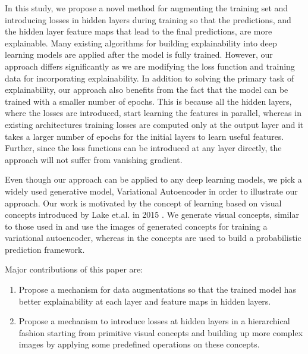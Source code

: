 \documentclass{bmvc2k}
\begin{document}
In this study, we propose a novel method for  augmenting the training set and introducing losses in hidden layers during training so that the predictions, and the hidden layer feature maps that lead to the final predictions,  are more explainable.
Many existing algorithms \cite{ribeiro2016should} \cite{lundberg2017unified} \cite{zhou2016learning} for building explainability into deep learning models are applied after the model is fully trained.
However, our approach differs significantly as we are modifying the loss function and training data for incorporating explainability.
In addition to solving  the primary task of explainability, our approach also benefits from the fact that  the model can be trained with a smaller number of epochs.
This is because all the hidden layers, where the losses are introduced,  start learning the features in parallel, whereas in existing architectures training losses are computed only at the output layer and it takes a larger number of epochs for the initial layers to learn useful features.
Further, since the loss functions can be introduced at any layer directly, the approach will not suffer from vanishing gradient.

Even though our approach can be applied to any deep learning models, we pick a widely used generative model, Variational Autoencoder \cite{kingma2013auto} in order to illustrate our approach.
Our work is motivated by the concept of learning based on visual concepts  introduced by Lake et.al. in 2015 \cite{lake2015human}.
We generate visual concepts, similar to those used in \cite{lake2015human} and use the images of generated concepts for training a variational autoencoder, whereas in \cite{lake2015human} the concepts are used to build a probabilistic prediction framework.


Major contributions of this paper are:
\begin{enumerate}
  \item Propose a mechanism for data augmentations so that the trained model has better explainability at each layer and feature maps in hidden layers.
  \item Propose a mechanism to introduce losses at hidden layers in a hierarchical fashion starting from primitive visual concepts and building up more complex images by applying some predefined operations on these concepts.
\end{enumerate}


\end{document}
